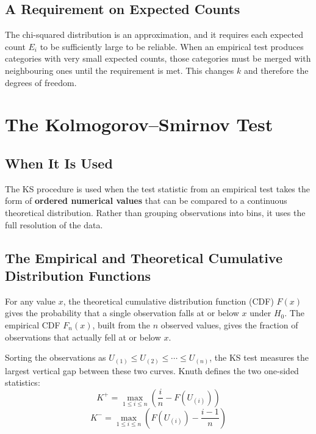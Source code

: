 \subsection{A Requirement on Expected Counts}
 
The chi-squared distribution is an approximation, and it requires each
expected count $E_i$ to be sufficiently large to be reliable.  When an
empirical test produces categories with very small expected counts, those
categories must be merged with neighbouring ones until the requirement is
met.  This changes $k$ and therefore the degrees of freedom.
 
\section{The Kolmogorov--Smirnov Test}\label{sec:ks-test}

\subsection{When It Is Used}
 
The KS procedure is used when the test statistic from an empirical test
takes the form of \textbf{ordered numerical values} that can be compared to
a continuous theoretical distribution.  Rather than grouping observations
into bins, it uses the full resolution of the data.
 
\subsection{The Empirical and Theoretical Cumulative Distribution Functions}
 
For any value $x$, the theoretical cumulative distribution function (CDF)
$F(x)$ gives the probability that a single observation falls at or below $x$
under $H_0$.  The empirical CDF $F_n(x)$, built from the $n$ observed values,
gives the fraction of observations that actually fell at or below $x$.
 
Sorting the observations as $U_{(1)} \leq U_{(2)} \leq \cdots \leq U_{(n)}$,
the KS test measures the largest vertical gap between these two curves.
Knuth defines the two one-sided statistics:
\[
  K^+ = \max_{1 \leq i \leq n} \left( \frac{i}{n} - F(U_{(i)}) \right)
\]
\[
  K^- = \max_{1 \leq i \leq n} \left( F(U_{(i)}) - \frac{i-1}{n} \right)
\]
 
